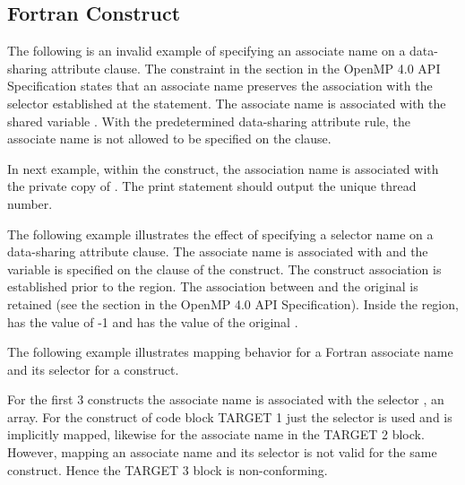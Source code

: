 \begin{fortranspecific}[4ex]
\section{Fortran  Construct}
\label{sec:associate}

The following is an invalid example of specifying an associate name on a data-sharing attribute 
clause. The constraint in the  section in the OpenMP 
4.0 API Specification states that an associate name preserves the association
with the selector established at the  statement. The associate 
name  is associated with the shared variable . With the predetermined data-sharing 
attribute rule, the associate name  is not allowed to be specified on the  
clause.

{}

In next example, within the  construct, the association name  
is associated with the private copy of . The print statement should output the 
unique thread number.


The following example illustrates the effect of specifying a selector name on a data-sharing 
attribute clause. The associate name  is associated with  and the variable  
is specified on the  clause of the  construct. 
The construct association is established prior to the  region. 
The association between  and the original  is retained (see the  section in the OpenMP 4.0 API Specification). Inside the 
region,  has the value of -1 and  has the value of the original .


\label{sec:associate_target}

\bigskip
The following example illustrates mapping behavior for a Fortran
associate name and its selector for a  construct.

For the first 3  constructs the associate name  is
associated with the selector , an array.  
For the  construct of code block TARGET 1 just the selector
 is used and is implicitly mapped,
likewise for the associate name  in the TARGET 2 block.  
However, mapping an associate name and its selector is not valid for the same
 construct.  Hence the TARGET 3 block is non-conforming.



\end{fortranspecific}
